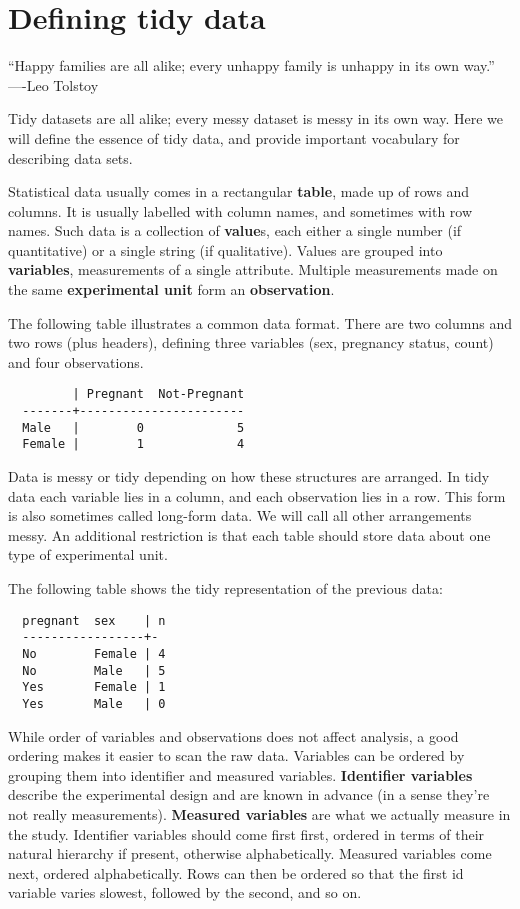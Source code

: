 \documentclass[oneside]{article}
\begin{document}
\section{Defining tidy data}

``Happy families are all alike; every unhappy family is unhappy in its own way.'' ----Leo Tolstoy

Tidy datasets are all alike; every messy dataset is messy in its own way. Here we will define the essence of tidy data, and provide important vocabulary for describing data sets.

Statistical data usually comes in a rectangular \textbf{table}, made up of rows and columns. It is usually labelled with column names, and sometimes with row names. Such data is a collection of \textbf{value}s, each either a single number (if quantitative) or a single string (if qualitative). Values are grouped into \textbf{variables}, measurements of a single attribute. Multiple measurements made on the same \textbf{experimental unit} form an \textbf{observation}. 

The following table illustrates a common data format. There are two columns and two rows (plus headers), defining three variables (sex, pregnancy status, count) and four observations.

\begin{verbatim}
         | Pregnant  Not-Pregnant
  -------+-----------------------
  Male   |        0             5
  Female |        1             4
\end{verbatim}

Data is messy or tidy depending on how these structures are arranged. In tidy data each variable lies in a column, and each observation lies in a row. This form is also sometimes called long-form data. We will call all other arrangements messy.  An additional restriction is that each table should store data about one type of experimental unit.

The following table shows the tidy representation of the previous data:

\begin{verbatim}
  pregnant  sex    | n
  -----------------+-
  No        Female | 4
  No        Male   | 5
  Yes       Female | 1
  Yes       Male   | 0
\end{verbatim}

While order of variables and observations does not affect analysis, a good ordering makes it easier to scan the raw data. Variables can be ordered by grouping them into identifier and measured variables. \textbf{Identifier variables} describe the experimental design and are known in advance (in a sense they're not really measurements). \textbf{Measured variables} are what we actually measure in the study. Identifier variables should come first first, ordered in terms of their natural hierarchy if present, otherwise alphabetically. Measured variables come next, ordered alphabetically. Rows can then be ordered so that the first id variable varies slowest, followed by the second, and so on.
\end{document}
